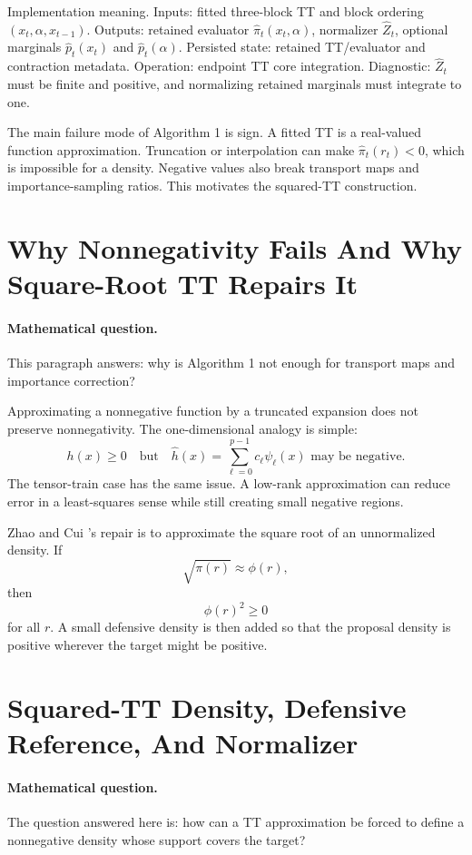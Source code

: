 \documentclass[11pt]{article}
\begin{document}
Implementation meaning. Inputs: fitted three-block TT and block ordering
\((x_t,\alpha,x_{t-1})\).  Outputs: retained evaluator
\(\widehat\pi_t(x_t,\alpha)\), normalizer \(\widehat Z_t\), optional marginals
\(\widehat p_t(x_t)\) and \(\widehat p_t(\alpha)\).  Persisted state: retained
TT/evaluator and contraction metadata.  Operation: endpoint TT core
integration.  Diagnostic: \(\widehat Z_t\) must be finite and positive, and
normalizing retained marginals must integrate to one.

The main failure mode of Algorithm 1 is sign.  A fitted TT is a real-valued
function approximation.  Truncation or interpolation can make
\(\widehat\pi_t(r_t)<0\), which is impossible for a density.  Negative values
also break transport maps and importance-sampling ratios.  This motivates the
squared-TT construction.

\section{Why Nonnegativity Fails And Why Square-Root TT Repairs It}

\paragraph{Mathematical question.}
This paragraph answers: why is Algorithm 1 not enough for transport maps and
importance correction?

Approximating a nonnegative function by a truncated expansion does not preserve
nonnegativity.  The one-dimensional analogy is simple:
\[
    h(x)\ge 0
    \quad\text{but}\quad
    \widehat h(x)=\sum_{\ell=0}^{p-1}c_\ell\psi_\ell(x)
    \text{ may be negative.}
\]
The tensor-train case has the same issue.  A low-rank approximation can reduce
error in a least-squares sense while still creating small negative regions.

Zhao and Cui \cite{zhao2024ttsequential}'s repair is to approximate the square root of an unnormalized density.
If
\[
    \sqrt{\pi(r)}\approx \phi(r),
\]
then
\[
    \phi(r)^2\ge 0
\]
for all \(r\).  A small defensive density is then added so that the proposal
density is positive wherever the target might be positive.

\section{Squared-TT Density, Defensive Reference, And Normalizer}

\paragraph{Mathematical question.}
The question answered here is: how can a TT approximation be forced to define a
nonnegative density whose support covers the target?
\end{document}

